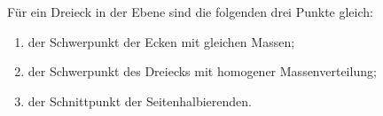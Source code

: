         \begin{prob}
%
F\"ur ein Dreieck in der Ebene sind die folgenden drei Punkte gleich:

\begin{enumerate}[label = (\alph*)]
	\item der Schwerpunkt der Ecken mit gleichen Massen;
	\item der Schwerpunkt des Dreiecks mit homogener Massenverteilung;
	\item der Schnittpunkt der Seitenhalbierenden.
\end{enumerate}

\vspace{2mm}
        \end{prob}
